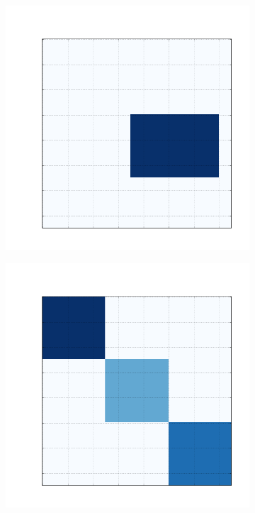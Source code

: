 \documentclass[
    12pt,                %
    oneside,            %
    a4paper,            %
    english,            %
    brazil                %
    ]{abntex2ppgsi}
\begin{document}
\begin{figure}[H]
    \begin{subfigure}[b]{0.18\textwidth}
        \includegraphics[width=\textwidth]{img/a-reconstruction-binovnmtf.png}
        \caption{}
    \end{subfigure}
    \begin{subfigure}[b]{0.18\textwidth}
        \includegraphics[width=\textwidth]{img/b-reconstruction-binovnmtf.png}

\end{subfigure}
\end{figure}
\end{document}
